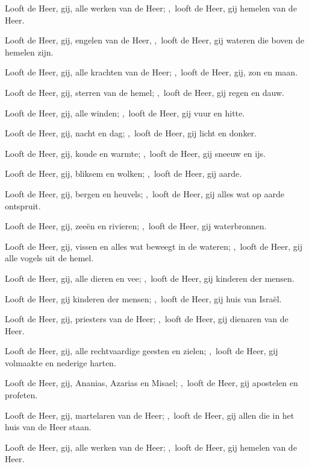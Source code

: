\documentclass[12pt,twoside,a5paper]{article}
\begin{document}


\begin{halfparskip}
  Looft de Heer, gij, alle werken van de Heer; \sep~looft de Heer, gij hemelen van de Heer.


  Looft de Heer, gij, engelen van de Heer, \sep~looft de Heer, gij wateren die boven de hemelen zijn.

  Looft de Heer, gij, alle krachten van de Heer; \sep~looft de Heer, gij, zon en maan.

  Looft de Heer, gij, sterren van de hemel; \sep~looft de Heer, gij regen en dauw.

  Looft de Heer, gij, alle winden; \sep~looft de Heer, gij vuur en hitte.

  Looft de Heer, gij, nacht en dag; \sep~looft de Heer, gij licht en donker.

  Looft de Heer, gij, koude en warmte; \sep~looft de Heer, gij sneeuw en ijs.

  Looft de Heer, gij, bliksem en wolken; \sep~looft de Heer, gij aarde.

  Looft de Heer, gij, bergen en heuvels; \sep~looft de Heer, gij alles wat op aarde ontspruit.

  Looft de Heer, gij, zeeën en rivieren; \sep~looft de Heer, gij waterbronnen.

  Looft de Heer, gij, vissen en alles wat beweegt in de wateren; \sep~looft de Heer, gij alle vogels uit de hemel.

  Looft de Heer, gij, alle dieren en vee; \sep~looft de Heer, gij kinderen der mensen.

  Looft de Heer, gij kinderen der mensen; \sep~looft de Heer, gij huis van Israël.

  Looft de Heer, gij, priesters van de Heer; \sep~looft de Heer, gij dienaren van de Heer.

  Looft de Heer, gij, alle rechtvaardige geesten en zielen; \sep~looft de Heer, gij volmaakte en nederige harten.

  Looft de Heer, gij, Ananias, Azarias en Misael; \sep~looft de Heer, gij apostelen en profeten.

  Looft de Heer, gij, martelaren van de Heer; \sep~looft de Heer, gij allen die in het huis van de Heer staan.

   Looft de Heer, gij, alle werken van de Heer; \sep~looft de Heer, gij hemelen van de Heer. 
\end{halfparskip}
\end{document}
